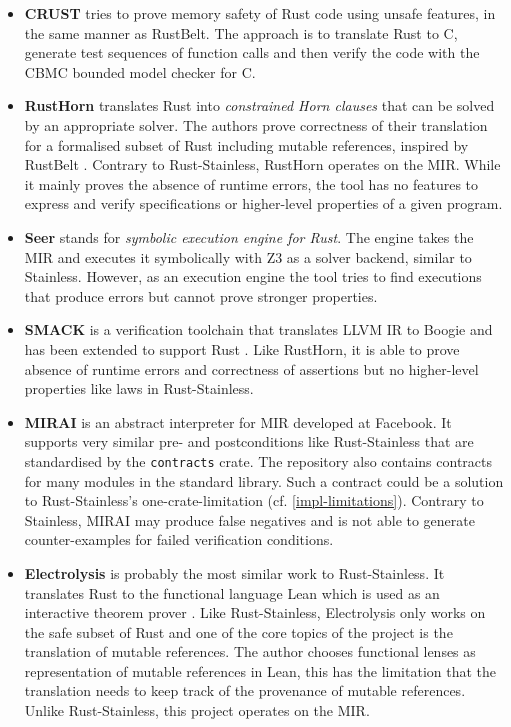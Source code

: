 \begin{itemize}

\item \textbf{CRUST} \cite{crust} tries to prove memory safety of Rust code
using unsafe features, in the same manner as RustBelt. The approach is to
translate Rust to C, generate test sequences of function calls and then verify
the code with the CBMC bounded model checker for C.

\item \textbf{RustHorn} \cite{rusthorn} translates Rust into \emph{constrained
Horn clauses} that can be solved by an appropriate solver. The authors prove
correctness of their translation for a formalised subset of Rust including
mutable references, inspired by RustBelt \cite{rustbelt}. Contrary to
Rust-Stainless, RustHorn operates on the MIR. While it mainly proves the absence
of runtime errors, the tool has no features to  express and verify
specifications or higher-level properties of a given program.

\item \textbf{Seer} \cite{seer} stands for \emph{symbolic execution engine for
Rust}. The engine takes the MIR and executes it symbolically with Z3 \cite{z3}
as a solver backend, similar to Stainless. However, as an execution engine the
tool tries to find executions that produce errors but cannot prove stronger
properties.

\item \textbf{SMACK} is a verification toolchain that translates LLVM IR to
Boogie \cite{boogie} and  has been extended to support Rust \cite{smack}. Like
RustHorn, it is able to prove absence of runtime errors and correctness of
assertions but no higher-level properties like laws in Rust-Stainless.

\item \textbf{MIRAI} \cite{mirai} is an abstract interpreter for MIR developed
at Facebook. It supports very similar pre- and postconditions like
Rust-Stainless that are standardised by the \lstinline!contracts! crate. The
repository also contains contracts for many modules in the standard library.
Such a contract could be a solution to Rust-Stainless's one-crate-limitation (cf.
\autoref{impl-limitations}).  Contrary to Stainless, MIRAI may produce false
negatives and  is not able to generate counter-examples for failed verification
conditions.

\item \textbf{Electrolysis} \cite{electrolysis} is probably the most similar
work to Rust-Stainless. It translates Rust to the functional language Lean which
is used as an interactive theorem prover \cite{lean}. Like Rust-Stainless,
Electrolysis only works on the safe subset of Rust and one of the core topics of
the project is the translation of mutable references. The author chooses
functional lenses as representation of mutable references in Lean, this has the
limitation that the translation needs to keep track of the provenance of mutable
references. Unlike Rust-Stainless, this project operates on the MIR.



\end{itemize}
